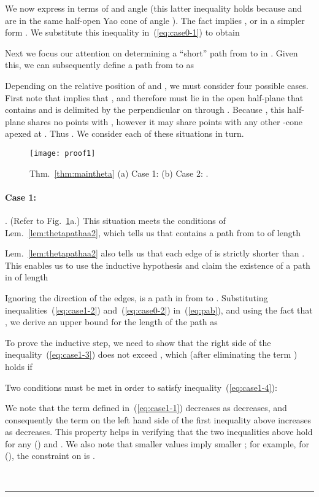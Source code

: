 \documentclass[11pt]{article}
\newcommand{\qed}{\rule{0.5em}{1.5ex}}
\newcommand{\fqed}{{\hfill~\qed}}
\newenvironment{proof}{{\noindent \bf Proof.}}
                      {{\hfill \fqed} \vspace{1em}}
\begin{document}
\begin{proof}
We now express  in terms of  and angle  (this latter inequality holds because  and  are in the same half-open Yao cone  of angle ). The fact  implies  , or in a simpler form . We substitute this inequality in~(\ref{eq:case0-1}) to obtain

Next we focus our attention on determining a ``short'' path  from  to  in . Given this, we can subsequently define a path  from  to  as

Depending on the relative position of  and , we must consider four possible cases. First note that  implies that , and therefore  must lie in the open half-plane that contains  and is delimited by the perpendicular on  through . Because , this half-plane shares no points with , however it may share points with any other -cone apexed at .
Thus . We consider each of these situations in turn.

\begin{figure}[htpb]
\centering
\texttt{[image: proof1]}
\caption{Thm.~\ref{thm:maintheta} (a) Case 1:  (b) Case 2: .}
\label{fig:proof1}
\end{figure}


\paragraph{Case 1:} . (Refer to Fig.~\ref{fig:proof1}a.) This situation meets the conditions of Lem.~\ref{lem:thetapathaa2}, which tells us that  contains a path  from  to  of length

Lem.~\ref{lem:thetapathaa2} also tells us that each edge of  is strictly shorter than . This enables us to use the inductive hypothesis and claim the existence of a path  in  of length

Ignoring the direction of the edges,  is a path in  from  to .
Substituting inequalities~(\ref{eq:case1-2}) and~(\ref{eq:case0-2}) in~(\ref{eq:pab}), and using the fact that
, we derive an upper bound for the length of the path  as

To prove the inductive step, we need to show that the right side of the inequality~(\ref{eq:case1-3}) does not exceed , which (after eliminating the term ) holds if

Two conditions must be met in order to satisfy inequality~(\ref{eq:case1-4}):

We note that the term  defined in~(\ref{eq:case1-1}) decreases as  decreases, and consequently the term on the left hand side of the first inequality above increases as  decreases. This property helps in verifying that the two inequalities above hold for any  () and . We also note that smaller  values imply smaller ; for example, for  (), the constraint on  is .


\end{proof}
\end{document}
